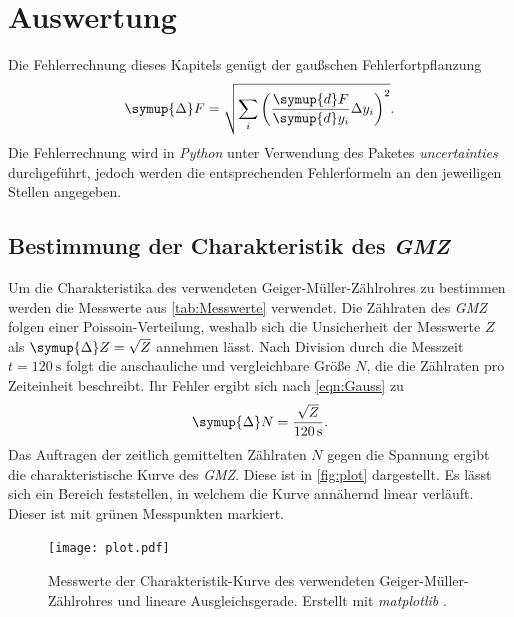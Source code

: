 \section{Auswertung}
\label{sec:Auswertung}
Die Fehlerrechnung dieses Kapitels genügt der gaußschen Fehlerfortpflanzung
\begin{equation}
  \label{eqn:Gauss}
  \symup{\Delta} F = \sqrt{\sum_i\left(\frac{\symup{d}F}{\symup{d}y_i}\Delta y_i \right)^2}.
\end{equation}
Die Fehlerrechnung wird in \textit{Python} unter Verwendung des Paketes \textit{uncertainties} \cite{uncertainties} durchgeführt, jedoch werden die entsprechenden Fehlerformeln
an den jeweiligen Stellen angegeben.

\subsection{Bestimmung der Charakteristik des \textit{GMZ}}
\label{subsec:A_Charakteristik}
Um die Charakteristika des verwendeten Geiger-Müller-Zählrohres zu bestimmen werden die Messwerte aus \autoref{tab:Messwerte} verwendet.
Die Zählraten des \textit{GMZ} folgen einer Poissoin-Verteilung, weshalb sich die Unsicherheit der Messwerte $Z$ als $\symup{\Delta}Z = \sqrt{Z}$ annehmen lässt.
Nach Division durch die Messzeit $t = \qty{120}{\second}$ folgt die anschauliche und vergleichbare Größe $N$, die die Zählraten pro Zeiteinheit beschreibt.
Ihr Fehler ergibt sich nach \eqref{eqn:Gauss} zu 
\begin{equation*}
  \symup{\Delta}N = \frac{\sqrt{Z}}{\qty{120}{\second}}.
\end{equation*} 
Das Auftragen der zeitlich gemittelten Zählraten $N$ gegen die Spannung ergibt die charakteristische Kurve des \textit{GMZ}. Diese ist in \autoref{fig:plot}
dargestellt. Es lässt sich ein Bereich feststellen, in welchem die Kurve annähernd linear verläuft. Dieser ist mit grünen Messpunkten markiert. 

\begin{figure}
  \centering
  \texttt{[image: plot.pdf]}
  \caption{Messwerte der Charakteristik-Kurve des verwendeten Geiger-Müller-Zählrohres und lineare Ausgleichsgerade. Erstellt mit \textit{matplotlib} \cite{matplotlib}.}
  \label{fig:plot}
\end{figure}

